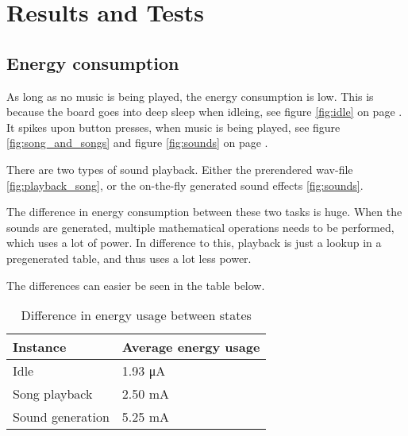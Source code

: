 \section{Results and Tests}

\subsection{Energy consumption}

As long as no music is being played, the energy consumption is low. This is because the board goes into deep sleep when idleing, see figure \ref{fig:idle} on page \pageref{fig:idle}.
It spikes upon button presses, when music is being played, see figure \ref{fig:song_and_songs} and figure \ref{fig:sounds} on page \pageref{fig:song_and_songs}.

There are two types of sound playback.
Either the prerendered wav-file \ref{fig:playback_song}, or the on-the-fly generated sound effects \ref{fig:sounds}.

The difference in energy consumption between these two tasks is huge.
When the sounds are generated, multiple mathematical operations needs to be performed, which uses a lot of power.
In difference to this, playback is just a lookup in a pregenerated table, and thus uses a lot less power.

The differences can easier be seen in the table below.

\begin{table}[ht!]
    \begin{center}
    \begin{tabular}{ | l | l | }
        \hline
        Instance            & Average energy usage \\
        \hline
        Idle                & 1.93 \si{\micro\ampere} \\
        \hline
        Song playback       & 2.50 \si{\milli\ampere} \\
        \hline
        Sound generation    & 5.25 \si{\milli\ampere} \\
        \hline
    \end{tabular}
    \caption{Difference in energy usage between states}
    \label{tab:energy_usage}
    \end{center}
\end{table}
